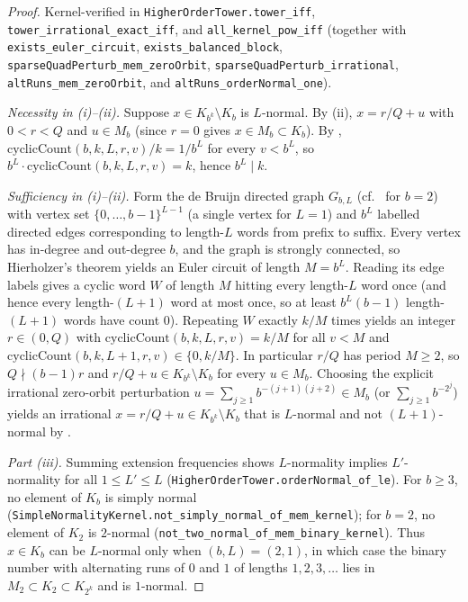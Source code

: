 \documentclass[11pt]{article}
\newcommand{\ttt}[1]{\texttt{#1}}
\begin{document}
\begin{proof}
Kernel-verified in \ttt{HigherOrderTower.tower\_iff}, \ttt{tower\_irrational\_exact\_iff}, and \ttt{all\_kernel\_pow\_iff} (together with \ttt{exists\_euler\_circuit}, \ttt{exists\_balanced\_block}, \ttt{sparseQuadPerturb\_mem\_zeroOrbit}, \ttt{sparseQuadPerturb\_irrational}, \ttt{altRuns\_mem\_zeroOrbit}, and \ttt{altRuns\_orderNormal\_one}).

\emph{Necessity in \textup{(i)}--\textup{(ii)}.} Suppose $x\in K_{b^k}\setminus K_b$ is $L$-normal. By (ii), $x=r/Q+u$ with $0<r<Q$ and $u\in M_b$ (since $r=0$ gives $x\in M_b\subset K_b$). By , $\mathrm{cyclicCount}(b,k,L,r,v)/k=1/b^L$ for every $v<b^L$, so $b^L\cdot\mathrm{cyclicCount}(b,k,L,r,v)=k$, hence $b^L\mid k$.

\emph{Sufficiency in \textup{(i)}--\textup{(ii)}.} Form the de Bruijn directed graph $G_{b,L}$ (cf.\ \cite{deBruijn46} for $b=2$) with vertex set $\{0,\dots,b-1\}^{L-1}$ (a single vertex for $L=1$) and $b^L$ labelled directed edges corresponding to length-$L$ words from prefix to suffix. Every vertex has in-degree and out-degree $b$, and the graph is strongly connected, so Hierholzer's theorem yields an Euler circuit of length $M=b^L$. Reading its edge labels gives a cyclic word $W$ of length $M$ hitting every length-$L$ word once (and hence every length-$(L+1)$ word at most once, so at least $b^L(b-1)$ length-$(L+1)$ words have count $0$). Repeating $W$ exactly $k/M$ times yields an integer $r\in(0,Q)$ with $\mathrm{cyclicCount}(b,k,L,r,v)=k/M$ for all $v<M$ and $\mathrm{cyclicCount}(b,k,L+1,r,v)\in\{0,k/M\}$. In particular $r/Q$ has period $M\ge2$, so $Q\nmid(b-1)r$ and $r/Q+u\in K_{b^k}\setminus K_b$ for every $u\in M_b$. Choosing the explicit irrational zero-orbit perturbation $u=\sum_{j\ge1}b^{-(j+1)(j+2)}\in M_b$ (or $\sum_{j\ge1}b^{-2^j}$) yields an irrational $x=r/Q+u\in K_{b^k}\setminus K_b$ that is $L$-normal and not $(L+1)$-normal by .

\emph{Part \textup{(iii)}.} Summing extension frequencies shows $L$-normality implies $L'$-normality for all $1\le L'\le L$ (\ttt{HigherOrderTower.orderNormal\_of\_le}). For $b\ge3$, no element of $K_b$ is simply normal (\ttt{SimpleNormalityKernel.not\_simply\_normal\_of\_mem\_kernel}); for $b=2$, no element of $K_2$ is $2$-normal (\ttt{not\_two\_normal\_of\_mem\_binary\_kernel}). Thus $x\in K_b$ can be $L$-normal only when $(b,L)=(2,1)$, in which case the binary number with alternating runs of $0$ and $1$ of lengths $1,2,3,\dots$ lies in $M_2\subset K_2\subset K_{2^k}$ and is $1$-normal.
\end{proof}
\end{document}
